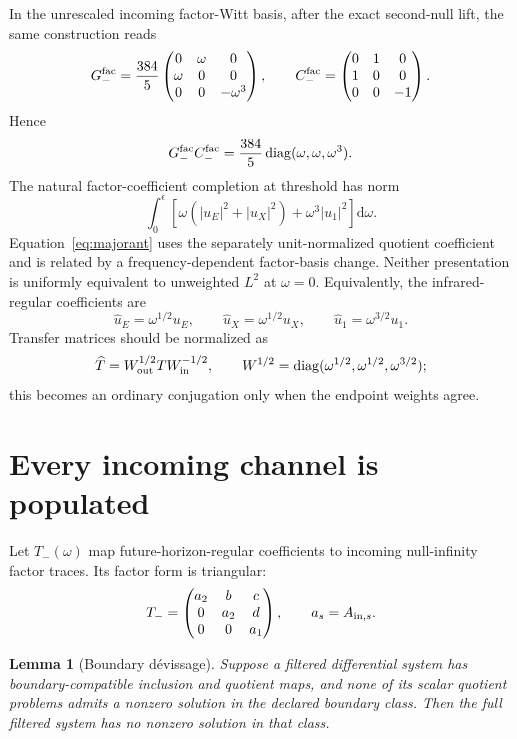 \documentclass[11pt]{article}
\newtheorem{lemma}[theorem]{Lemma}
\theoremstyle{definition}
\theoremstyle{remark}
\newcommand{\dd}{\mathrm d}
\begin{document}
In the unrescaled incoming factor-Witt basis, after the exact second-null
lift, the same construction reads
\[
G_-^{\rm fac}
=
\frac{384}{5}
\begin{pmatrix}
0&\omega&0\\
\omega&0&0\\
0&0&-\omega^3
\end{pmatrix},
\qquad
C_-^{\rm fac}
=
\begin{pmatrix}
0&1&0\\
1&0&0\\
0&0&-1
\end{pmatrix}.
\]
Hence
\[
G_-^{\rm fac}C_-^{\rm fac}
=
\frac{384}{5}\operatorname{diag}(\omega,\omega,\omega^3).
\]
The natural factor-coefficient completion at threshold has norm
\[
\int_0^\epsilon
\left[
\omega(|u_E|^2+|u_X|^2)+\omega^3|u_1|^2
\right]\dd\omega.
\]
Equation~\eqref{eq:majorant} uses the separately unit-normalized quotient
coefficient and is related by a frequency-dependent factor-basis change.
Neither presentation is uniformly equivalent to unweighted \(L^2\) at
\(\omega=0\).
Equivalently, the infrared-regular coefficients are
\[
\widehat u_E=\omega^{1/2}u_E,\qquad
\widehat u_X=\omega^{1/2}u_X,\qquad
\widehat u_1=\omega^{3/2}u_1.
\]
Transfer matrices should be normalized as
\[
\widehat T=W_{\rm out}^{1/2}TW_{\rm in}^{-1/2},
\qquad
W^{1/2}=\operatorname{diag}
(\omega^{1/2},\omega^{1/2},\omega^{3/2});
\]
this becomes an ordinary conjugation only when the endpoint weights agree.

\section{Every incoming channel is populated}

Let \(T_-(\omega)\) map future-horizon-regular coefficients to incoming
null-infinity factor traces.  Its factor form is triangular:
\begin{equation}
\label{eq:tminus}
T_-=
\begin{pmatrix}
a_2&b&c\\
0&a_2&d\\
0&0&a_1
\end{pmatrix},
\qquad
a_s=A_{{\rm in},s}.
\end{equation}

\begin{lemma}[Boundary d\'evissage]
\label{lem:devissage}
Suppose a filtered differential system has boundary-compatible inclusion and
quotient maps, and none of its scalar quotient problems admits a nonzero
solution in the declared boundary class.  Then the full filtered system has
no nonzero solution in that class.
\end{lemma}
\end{document}

